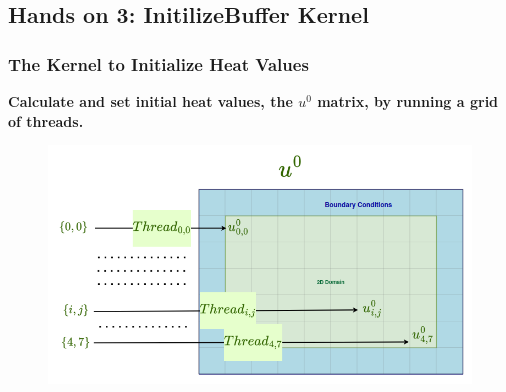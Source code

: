 \documentclass[9pt]{beamer}
\begin{document}
\subsection{Hands on 3: InitilizeBuffer Kernel}

\begin{frame}
\frametitle{The Kernel to Initialize Heat Values}
\textbf{Calculate and set initial heat values, the $u^{0}$ matrix, by running a grid of threads.}
\hspace{2.0\baselineskip}
\begin{figure}
    \centering
    \includegraphics[width=0.8\linewidth]{Screenshot from 2024-09-19 18-45-43.png}
    \label{fig:enter-label}
\end{figure}
\end{frame}
\end{document}

